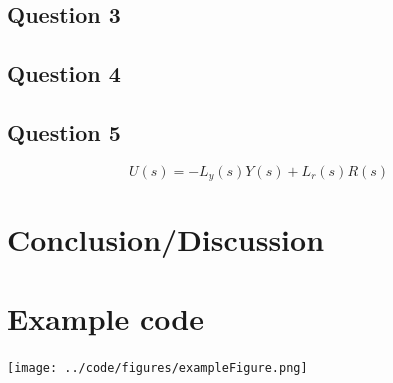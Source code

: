 \documentclass[a4paper, titlepage]{article}
\begin{document}
\subsection{Question 3}

\subsection{Question 4}

\subsection{Question 5}

\begin{equation}
U(s) = -L_y(s)Y(s) + L_r(s)R(s) 
\end{equation}



\section{Conclusion/Discussion}


\section{Example code}

\texttt{[image: ../code/figures/exampleFigure.png]}


\end{document}
